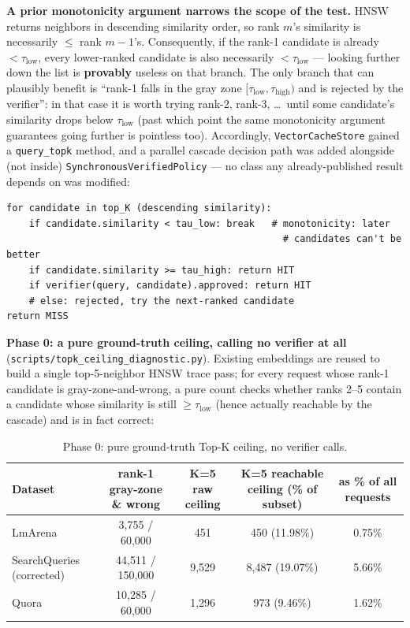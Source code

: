 \documentclass[11pt]{article}
\newcommand{\taulow}{\ensuremath{\tau_{\text{low}}}}
\newenvironment{fittab}{\begin{lrbox}{\fittabbox}}{\end{lrbox}%
  \ifdim\wd\fittabbox>\linewidth\resizebox{\linewidth}{!}{\usebox{\fittabbox}}\else\usebox{\fittabbox}\fi}
\newcommand{\tauhigh}{\ensuremath{\tau_{\text{high}}}}
\begin{document}
\textbf{A prior monotonicity argument narrows the scope of the test.} HNSW returns neighbors in descending similarity order, so rank $m$'s similarity is necessarily $\le$ rank $m{-}1$'s. Consequently, if the rank-1 candidate is already $<\taulow$, every lower-ranked candidate is also necessarily $<\taulow$ --- looking further down the list is \textbf{provably} useless on that branch. The only branch that can plausibly benefit is ``rank-1 falls in the gray zone $[\taulow, \tauhigh)$ and is rejected by the verifier'': in that case it is worth trying rank-2, rank-3, \ldots\ until some candidate's similarity drops below $\taulow$ (past which point the same monotonicity argument guarantees going further is pointless too). Accordingly, \texttt{Vector\allowbreak{}Cache\allowbreak{}Store} gained a \texttt{query\_\allowbreak{}topk} method, and a parallel cascade decision path was added alongside (not inside) \texttt{Synchronous\allowbreak{}Verified\allowbreak{}Policy} --- no class any already-published result depends on was modified:

\begin{verbatim}
for candidate in top_K (descending similarity):
    if candidate.similarity < tau_low: break   # monotonicity: later
                                                 # candidates can't be better
    if candidate.similarity >= tau_high: return HIT
    if verifier(query, candidate).approved: return HIT
    # else: rejected, try the next-ranked candidate
return MISS
\end{verbatim}

\textbf{Phase 0: a pure ground-truth ceiling, calling no verifier at all} (\texttt{scripts/\allowbreak{}topk\_\allowbreak{}ceiling\_\allowbreak{}diagnostic.\allowbreak{}py}). Existing embeddings are reused to build a single top-5-neighbor HNSW trace pass; for every request whose rank-1 candidate is gray-zone-and-wrong, a pure count checks whether ranks 2--5 contain a candidate whose similarity is still $\ge \taulow$ (hence actually reachable by the cascade) and is in fact correct:

\begin{table}[h]
\centering
\small
\begin{fittab}\begin{tabular}{lcccc}
\toprule
\textbf{Dataset} & \textbf{rank-1 gray-zone \& wrong} & \textbf{K=5 raw ceiling} & \textbf{K=5 reachable ceiling (\% of subset)} & \textbf{as \% of all requests} \\
\midrule
LmArena & 3{,}755 / 60{,}000 & 451 & 450 (11.98\%) & 0.75\% \\
SearchQueries (corrected) & 44{,}511 / 150{,}000 & 9{,}529 & 8{,}487 (19.07\%) & 5.66\% \\
Quora & 10{,}285 / 60{,}000 & 1{,}296 & 973 (9.46\%) & 1.62\% \\
\bottomrule
\end{tabular}\end{fittab}
\caption{Phase 0: pure ground-truth Top-K ceiling, no verifier calls.}
\end{table}
\end{document}
